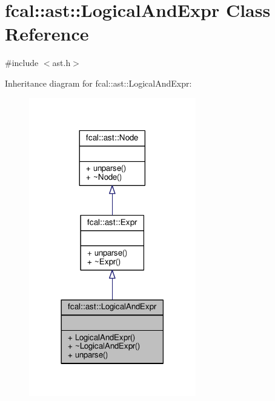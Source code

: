 \hypertarget{classfcal_1_1ast_1_1LogicalAndExpr}{}\section{fcal\+:\+:ast\+:\+:Logical\+And\+Expr Class Reference}
\label{classfcal_1_1ast_1_1LogicalAndExpr}


{\ttfamily \#include $<$ast.\+h$>$}



Inheritance diagram for fcal\+:\+:ast\+:\+:Logical\+And\+Expr\+:
\nopagebreak
\begin{figure}[H]
\begin{center}
\leavevmode
\includegraphics[width=206pt]{classfcal_1_1ast_1_1LogicalAndExpr__inherit__graph}
\end{center}
\end{figure}


